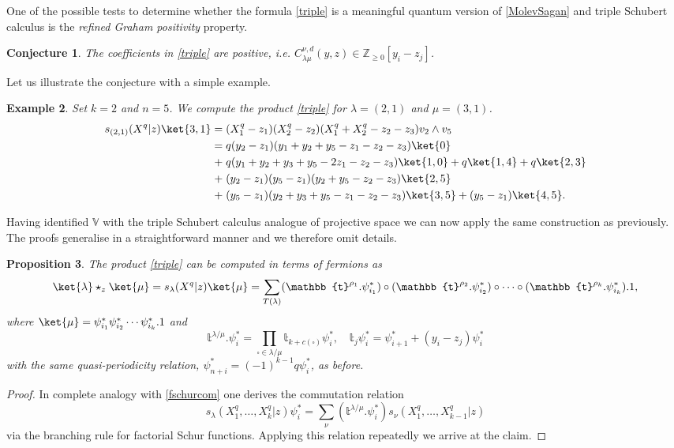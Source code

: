 \documentclass[12pt]{amsart}
\newcommand{\Z}{\mathbb{Z}}
\newcommand{\mb}[1]{\mathbb{#1}}
\newcommand{\bt}{\mathbb{t}}
\newtheorem{prop}{Proposition}[section]
\newtheorem{example}[prop]{Example}
\newtheorem{conjecture}[prop]{Conjecture}
\numberwithin{equation}{section}
\numberwithin{figure}{section}
\begin{document}
 One of the possible tests to determine whether the formula \eqref{triple} is a meaningful quantum version of \eqref{MolevSagan} and triple Schubert calculus is the {\em refined Graham positivity} property.
\begin{conjecture}
    The coefficients in \eqref{triple} are positive, i.e. $C^{\nu,d}_{\lambda \mu}(y,z) \in \Z_{\geq 0}[y_i - z_j]$.
\end{conjecture}
\noindent Let us illustrate the conjecture with a simple example.
\begin{example}
    Set $k = 2$ and $n = 5$. We compute the product \eqref{triple} for $\lambda = (2,1)$ and $\mu = (3,1)$. 
    \begin{align*}
        s_{(2,1)}(X^q|z) \ket{3,1} =\;& (X_1^q - z_1)(X_2^q - z_2)(X_1^q + X_2^q - z_2 - z_3) v_2 \wedge v_5\\
        =\;& q(y_2 - z_1)(y_1 + y_2 + y_5 - z_1 - z_2 - z_3) \ket{0}\\
        +\;& q(y_1 + y_2 + y_3 + y_5 - 2z_1 - z_2 - z_3)\ket{1,0} + q \ket{1,4} + q \ket{2,3} \\
        +\;& (y_2 - z_1)(y_5 - z_1)(y_2 + y_5 - z_2 - z_3)\ket{2,5} \\
        +\;& (y_5 - z_1)(y_2 + y_3 + y_5 - z_1 - z_2 - z_3)\ket{3,5} + (y_5 - z_1) \ket{4,5}.
    \end{align*}
\end{example}
\noindent Having identified $\mb{V}$ with the triple Schubert calculus analogue of projective space we can now apply the same construction as previously. The proofs generalise in a straightforward manner and we therefore omit details.
\begin{prop}
    The product \eqref{triple} can be computed in terms of fermions as
    \begin{equation}\label{triplefermi}
        \ket{\lambda}\star_z\ket{\mu}=s_{\lambda}(X^q|z)\ket{\mu} = \sum\limits_{T(\lambda)} (\bt^{\rho_1}. \psi^{*}_{i_1})\circ (\bt^{\rho_{2}}.\psi^*_{i_{2}})\circ \cdots\circ(\bt^{\rho_k}.\psi^*_{i_k}).1,
    \end{equation}
    where $\ket{\mu} = \psi^*_{i_1} \psi^*_{i_2} \cdots \psi^*_{i_k}.1$ and
    \[
    \bt^{\lambda/\mu}.\psi^*_i = \prod\limits_{\square \in \lambda/ \mu} \bt_{k + c(\square)}\psi^*_i, \quad \bt_j \psi^*_i = \psi^*_{i + 1} + (y_i - z_j) \psi^*_i
    \]
    with the same quasi-periodicity relation, $\psi^*_{n+i}=(-1)^{k-1}q\psi^*_i$, as before.
\end{prop}
\begin{proof}
    In complete analogy with \eqref{fschurcom} one derives the commutation relation
    \begin{equation}\label{triplecom}
        s_{\lambda}(X_1^q, \ldots , X_k^q|z)\psi^*_i = \sum\limits_{\nu} (\bt^{\lambda/\mu}.\psi^*_i)s_{\nu}(X_1^q, \ldots , X_{k - 1}^q|z)
    \end{equation}
    via the branching rule for factorial Schur functions. Applying this relation repeatedly we arrive at the claim.
\end{proof}
\end{document}
